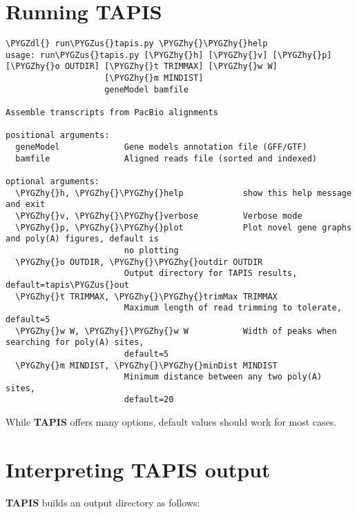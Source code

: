 \documentclass[letterpaper,10pt,english]{sphinxmanual}
\def\PYGZus{\char`\_}
\def\PYGZdl{\char`\$}
\def\PYGZhy{\char`\-}
\begin{document}
\section{Running \textbf{TAPIS}}
\label{tutorial:running-tapis}
\begin{Verbatim}[commandchars=\\\{\}]
\PYGZdl{} run\PYGZus{}tapis.py \PYGZhy{}\PYGZhy{}help
usage: run\PYGZus{}tapis.py [\PYGZhy{}h] [\PYGZhy{}v] [\PYGZhy{}p] [\PYGZhy{}o OUTDIR] [\PYGZhy{}t TRIMMAX] [\PYGZhy{}w W]
                    [\PYGZhy{}m MINDIST]
                    geneModel bamfile

Assemble transcripts from PacBio alignments

positional arguments:
  geneModel             Gene models annotation file (GFF/GTF)
  bamfile               Aligned reads file (sorted and indexed)

optional arguments:
  \PYGZhy{}h, \PYGZhy{}\PYGZhy{}help            show this help message and exit
  \PYGZhy{}v, \PYGZhy{}\PYGZhy{}verbose         Verbose mode
  \PYGZhy{}p, \PYGZhy{}\PYGZhy{}plot            Plot novel gene graphs and poly(A) figures, default is
                        no plotting
  \PYGZhy{}o OUTDIR, \PYGZhy{}\PYGZhy{}outdir OUTDIR
                        Output directory for TAPIS results, default=tapis\PYGZus{}out
  \PYGZhy{}t TRIMMAX, \PYGZhy{}\PYGZhy{}trimMax TRIMMAX
                        Maximum length of read trimming to tolerate, default=5
  \PYGZhy{}w W, \PYGZhy{}\PYGZhy{}w W           Width of peaks when searching for poly(A) sites,
                        default=5
  \PYGZhy{}m MINDIST, \PYGZhy{}\PYGZhy{}minDist MINDIST
                        Minimum distance between any two poly(A) sites,
                        default=20
\end{Verbatim}

While \textbf{TAPIS} offers many options, default values should work
for most cases.


\section{Interpreting \textbf{TAPIS} output}
\label{tutorial:interpreting-tapis-output}
\textbf{TAPIS} builds an output directory as follows:
\end{document}
